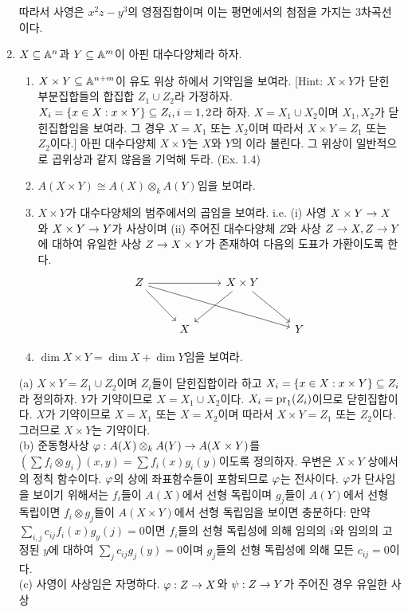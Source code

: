 \begin{enumerate}[label=\tb{3.\arabic*.},itemindent=0mm,itemsep=4mm]
		따라서 사영은 $x^2z-y^3$의 영점집합이며 이는 평면에서의 첨점을 가지는 3차곡선이다.
		\item {} $X\subseteq\mathbb{A}^n$과 $Y\subseteq\mathbb{A}^m$이 아핀 대수다양체라 하자.
		\begin{enumerate}[label=(\alph*)]
		\item $X\times Y\subseteq\mathbb{A}^{n+m}$이 유도 위상 하에서 기약임을 보여라.
		[Hint: $X\times Y$가 닫힌 부분집합들의 합집합 $Z_1\cup Z_2$라 가정하자.
		$X_i=\{x\in X:x\times Y\}\subseteq Z_i,i=1,2$라 하자. $X=X_1\cup X_2$이며 $X_1,X_2$가 닫힌집합임을 보여라.
		그 경우 $X=X_1$ 또는 $X_2$이며 따라서 $X\times Y=Z_1$ 또는 $Z_2$이다.]
		아핀 대수다양체 $X\times Y$는 $X$와 $Y$의 이라 불린다.
		그 위상이 일반적으로 곱위상과 같지 않음을 기억해 두라. (Ex. 1.4)
		\item $A(X\times Y)\cong A(X)\otimes_kA(Y)$임을 보여라.
		\item $X\times Y$가 대수다양체의 범주에서의 곱임을 보여라. i.e. (i) 사영 $X\times Y\rightarrow X$와 $X\times Y\rightarrow Y$가 사상이며
		(ii) 주어진 대수다양체 $Z$와 사상 $Z\rightarrow X,Z\rightarrow Y$에 대하여 유일한 사상 $Z\rightarrow X\times Y$가 존재하여
		다음의 도표가 가환이도록 한다.
		$$\begin{tikzcd}[row sep=large]Z\arrow[rr]\arrow[dr]\arrow[drrr]&&X\times Y\arrow[dl]\arrow[dr]\\&X&&Y\end{tikzcd}$$
		\item $\dim X\times Y=\dim X+\dim Y$임을 보여라.
		\end{enumerate}
		\sol (a) $X\times Y=Z_1\cup Z_2$이며 $Z_i$들이 닫힌집합이라 하고 $X_i=\{x\in X:x\times Y\}\subseteq Z_i$라 정의하자.
		$Y$가 기약이므로 $X=X_1\cup X_2$이다. $X_i=\mathrm{pr}_1(Z_i)$이므로 닫힌집합이다.
		$X$가 기약이므로 $X=X_1$ 또는 $X=X_2$이며 따라서 $X\times Y=Z_1$ 또는 $Z_2$이다. 그러므로 $X\times Y$는 기약이다.\\
		(b) 준동형사상 $\varphi:A(X)\otimes_kA(Y)\rightarrow A(X\times Y)$를 $(\sum f_i\otimes g_i)(x,y)=\sum f_i(x)g_i(y)$이도록 정의하자.
		우변은 $X\times Y$ 상에서의 정칙 함수이다. $\varphi$의 상에 좌표함수들이 포함되므로 $\varphi$는 전사이다.
		$\varphi$가 단사임을 보이기 위해서는 $f_i$들이 $A(X)$에서 선형 독립이며 $g_j$들이 $A(Y)$에서 선형 독립이면
		$f_i\otimes g_j$들이 $A(X\times Y)$에서 선형 독립임을 보이면 충분하다:
		만약 $\sum_{i,j}c_{ij}f_i(x)g_y(j)=0$이면 $f_i$들의 선형 독립성에 의해 임의의 $i$와 임의의 고정된 $y$에 대하여
		$\sum_jc_{ij}g_j(y)=0$이며 $g_j$들의 선형 독립성에 의해 모든 $c_{ij}=0$이다.\\
		(c) 사영이 사상임은 자명하다. $\varphi:Z\rightarrow X$와 $\psi:Z\rightarrow Y$가 주어진 경우 유일한 사상

\end{enumerate}
